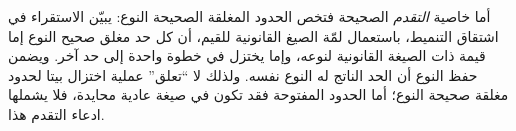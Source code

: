 \documentclass[../../../include/open-logic-section]{subfiles}
\begin{document}
أما خاصية \emph{التقدم} الصحيحة فتخص الحدود المغلقة الصحيحة النوع: يبيّن
الاستقراء في اشتقاق التنميط، باستعمال لمّة الصيغ القانونية للقيم، أن كل حد
مغلق صحيح النوع إما قيمة ذات الصيغة القانونية لنوعه، وإما يختزل في خطوة
واحدة إلى حد آخر. ويضمن حفظ النوع أن الحد الناتج له النوع نفسه. ولذلك لا
``تعلق'' عملية اختزال بيتا لحدود مغلقة صحيحة النوع؛ أما الحدود المفتوحة فقد
تكون في صيغة عادية محايدة، فلا يشملها ادعاء التقدم هذا.
\end{document}
